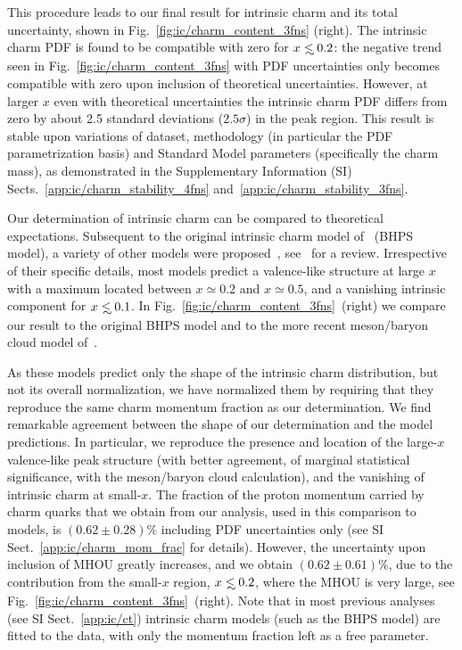 This procedure leads to our final result for intrinsic charm and its total
uncertainty, shown in Fig.~\ref{fig:ic/charm_content_3fns} (right).
%
The intrinsic charm PDF is found to be compatible with zero for
$x\lsim 0.2$: the negative trend 
seen  in Fig.~\ref{fig:ic/charm_content_3fns} with PDF uncertainties only 
becomes 
compatible with zero upon inclusion of  theoretical
uncertainties. However, at
larger $x$ even with theoretical uncertainties
the intrinsic charm PDF
 differs 
from zero by about 2.5 standard deviations ($2.5\sigma$) in the peak region.
%
This result  is stable upon variations of dataset, methodology (in
particular the PDF  parametrization basis) and Standard Model
parameters (specifically the charm mass),
as demonstrated in the Supplementary Information (SI) Sects.~\ref{app:ic/charm_stability_4fns}
and~\ref{app:ic/charm_stability_3fns}. 

Our determination of intrinsic charm can be compared to theoretical expectations.
%
Subsequent to the
original intrinsic charm model of~\cite{Brodsky:1980pb} (BHPS
model),
a variety of other models were  
proposed~\cite{Hoffmann:1983ah,Pumplin:2005yf,Paiva:1996dd,Steffens:1999hx,Hobbs:2013bia},
see~\cite{Brodsky:2015fna} for a review.
%
Irrespective of their specific details, most models predict a valence-like
structure at large $x$ 
with a maximum located  between $x\simeq 0.2$ and $x\simeq 0.5$, and a
vanishing intrinsic component for
$x\lsim 0.1$.
%
In Fig.~\ref{fig:ic/charm_content_3fns}~(right) we compare our result to
the original BHPS model and to the more recent meson/baryon cloud model of~\cite{Hobbs:2013bia}.

As these models predict only the shape of the
intrinsic charm distribution, but not 
its overall normalization, we have normalized them by requiring
that they reproduce the same 
charm momentum fraction as our determination.
%
We find remarkable agreement between the shape of our 
determination and the model predictions.
%
In particular, we reproduce  the presence and location of the large-$x$ valence-like peak
structure (with  better agreement, of marginal statistical significance, with
the meson/baryon cloud calculation),  and the vanishing of 
intrinsic charm at small-$x$.
%
The fraction of the proton momentum carried by charm quarks that we
obtain from our analysis, 
used in this comparison to models,  is $\left( 0.62 \pm 0.28\right) \%$
including PDF uncertainties only (see
SI Sect.~\ref{app:ic/charm_mom_frac} for details).
%
However, the uncertainty
upon inclusion of MHOU greatly increases, and we obtain
$\left( 0.62 \pm 0.61\right) \%$, due to the contribution from the small-$x$
region, $x\lsim 0.2$, where the MHOU is very large, see
Fig.~\ref{fig:ic/charm_content_3fns}~(right).
%
%
Note that in most previous
analyses~\cite{Hou:2017khm} (see SI Sect.~\ref{app:ic/ct}) intrinsic charm models (such as the BHPS
model) are fitted to the data, with only the momentum fraction left as
a free parameter.

